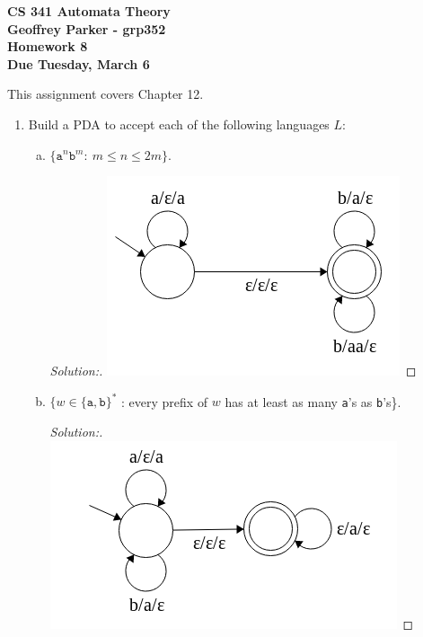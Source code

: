 \documentclass[10pt]{article}
\begin{document}
\begin{flushleft}
\textbf{\noindent
CS 341 Automata Theory \\
Geoffrey Parker - grp352 \\
Homework 8 \\
Due Tuesday, March 6}\\
\end{flushleft}
\noindent
This assignment covers Chapter 12. \\

\begin{enumerate}[1)]


\item
Build a PDA to accept each of the following languages $L$:
\begin{enumerate}[a)]
\item
$\{\texttt{a}^n\texttt{b}^m:\ m \leq n \leq 2m\}$.
\begin{proof}[Solution:]
\includegraphics[scale=.5]{images/solutions/1a.png}
\end{proof}

\item
$\{w \in \{\texttt{a}, \texttt{b}\}^*$ : every prefix of $w$ has at least as many \texttt{a}'s as \texttt{b}'s\}.
\begin{proof}[Solution:] $ $\\
\includegraphics[scale=.5]{images/solutions/1b.png}
\end{proof}


\end{enumerate}
\end{enumerate}
\end{document}
